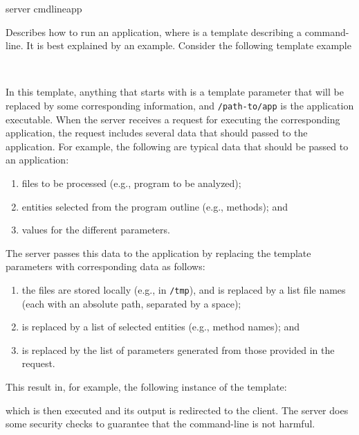 \noindent
\xmlstruct
{server}
{cmdlineapp}
{%
%
  Describes how to run an application, where
   is a template describing a
  command-line. It is best explained by an example. Consider the
  following template example

  \bigskip
  ~~~
  
  \bigskip
  \noindent
  In this template, anything that starts with 
  is a template parameter that will be replaced by some corresponding
  information, and \texttt{/path-to/app} is the application
  executable.
  When the server receives a request for executing the corresponding
  application, the request includes several data that should passed to
  the application. For example, the following are typical data that
  should be passed to an application:
  \begin{enumerate}
  \item files to be processed (e.g., program to be analyzed);
  \item entities selected from the program outline (e.g., methods); and
  \item values for the different parameters.
  \end{enumerate}
  The server passes this data to the application by replacing the
  template parameters with corresponding data as follows:
  \begin{enumerate}
  \item the files are stored locally (e.g., in \texttt{/tmp}), and
     is replaced by a list file names
    (each with an absolute path, separated by a space);
  \item {} is replaced by a list of
    selected entities (e.g., method names); and
  \item {} is replaced by the list of
    parameters generated from those provided in the request.
  \end{enumerate}
  This result in, for example, the following instance of the template:

  \bigskip
  \hspace{0.7cm}

  \bigskip 
  \noindent
  which is then executed and its output is redirected to the
  client. The server does some security checks to guarantee that the
  command-line is not harmful. %

}
